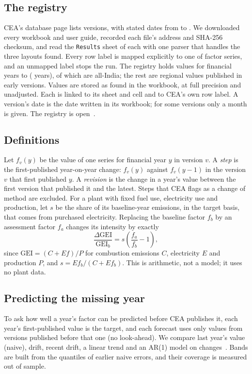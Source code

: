 \documentclass[conference]{IEEEtran}
\begin{document}
\subsection{The registry}
CEA's database page lists \nVersions{} versions, with stated dates from \dateFirst{} to \dateLast{}. We downloaded every workbook and user guide, recorded each file's address and SHA-256 checksum, and read the \texttt{Results} sheet of each with one parser that handles the three layouts found. Every row label is mapped explicitly to one of \nSeriesKeys{} factor series, and an unmapped label stops the run. The registry holds \nValues{} values for financial years \firstFY{} to \lastFY{} (\nYears{} years), of which \nIndia{} are all-India; the rest are regional values published in early versions. Values are stored as found in the workbook, at full precision and unadjusted. Each is linked to its sheet and cell and to CEA's own row label. A version's date is the date written in its workbook; for some versions only a month is given. The registry is open~\cite{repo}.

\subsection{Definitions}
Let $f_{v}(y)$ be the value of one series for financial year $y$ in version $v$. A \emph{step} is the first-published year-on-year change: $f_v(y)$ against $f_v(y-1)$ in the version $v$ that first published $y$. A \emph{revision} is the change in a year's value between the first version that published it and the latest. Steps that CEA flags as a change of method are excluded. For a plant with fixed fuel use, electricity use and production, let $s$ be the share of its baseline-year emissions, in the target basis, that comes from purchased electricity. Replacing the baseline factor $f_b$ by an assessment factor $f_a$ changes its intensity by exactly
\begin{equation}
\frac{\Delta\mathrm{GEI}}{\mathrm{GEI}_b} = s\left(\frac{f_a}{f_b}-1\right),
\label{eq:gei}
\end{equation}
since $\mathrm{GEI}=(C+E f)/P$ for combustion emissions $C$, electricity $E$ and production $P$, and $s = E f_b/(C+E f_b)$. This is arithmetic, not a model; it uses no plant data.

\subsection{Predicting the missing year}
To ask how well a year's factor can be predicted before CEA publishes it, each year's first-published value is the target, and each forecast uses only values from versions published before that one (no look-ahead). We compare last year's value (naive), drift, recent drift, a linear trend and an AR(1) model on changes~\cite{hyndman}. Bands are built from the quantiles of earlier naive errors, and their coverage is measured out of sample.
\end{document}
